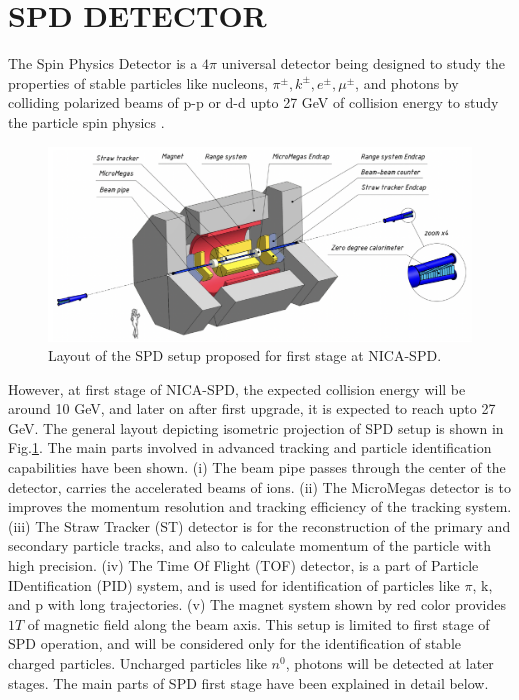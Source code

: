 \documentclass[12pt, twocolumn]{article}
\begin{document}
\section{SPD DETECTOR}
\label{SPD DETECTOR}
The Spin Physics Detector is a $4\pi$ universal detector being designed to study the properties of stable particles like nucleons, $\pi^{\pm}, k^{\pm}, e^{\pm}, \mu^{\pm}$, and photons by colliding polarized beams of p-p or d-d upto 27 GeV of collision energy to study the particle spin physics \cite{guskov2021spin, arbuzov2021physics, kekelidze2017feasibility}.
\begin{figure}[h]
\centering
\includegraphics[scale=0.4]{Layout of the SPD setup proposed for first stage at NICA-SPD.png}
\caption{Layout of the SPD setup proposed for first stage at NICA-SPD.}
\label{Layout of the SPD setup proposed for first stage at NICA-SPD.}
\end{figure}
However, at first stage of NICA-SPD, the expected collision energy will be around 10 GeV, and later on after first upgrade, it is expected to reach upto 27 GeV. The general layout depicting isometric projection of SPD setup is shown in Fig.\ref{Layout of the SPD setup proposed for first stage at NICA-SPD.}. The main parts involved in advanced tracking and particle identification capabilities have been shown. (i) The beam pipe passes through the center of the detector, carries the accelerated beams of ions. (ii) The MicroMegas detector is to improves the momentum resolution and tracking efficiency of the tracking system. (iii) The Straw Tracker (ST) detector is for the reconstruction of the primary and secondary particle tracks, and also to calculate momentum of the particle with high precision. (iv) The Time Of Flight (TOF) detector, is a part of Particle IDentification (PID) system, and is used for identification of particles like $\pi$, k, and p with long trajectories. (v) The magnet system shown by red color provides $1T$ of magnetic field along the beam axis. This setup is limited to first stage of SPD operation, and will be considered only for the identification of stable charged particles. Uncharged particles like $n^{0}$, photons will be detected at later stages. The main parts of SPD first stage have been explained in detail below.
\end{document}
